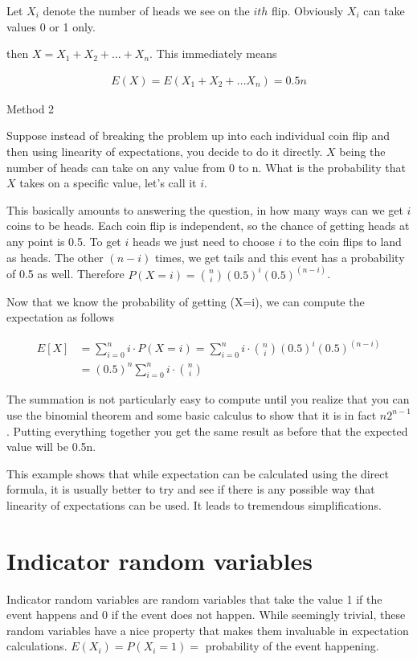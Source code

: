 \documentclass[12pt]{article}
\begin{document}
Let $X_i$ denote the number of heads we see on the $ith$ flip. Obviously $X_i$ can take values 0 or 1 only. 

then $X = X_1 + X_2 + \ldots + X_n$. This immediately means

\begin{align*}
E(X) = E(X_1 + X_2 + \ldots X_n) = 0.5n
\end{align*}

Method 2

Suppose instead of breaking the problem up into each individual coin flip and then using linearity of expectations, you decide to do it directly. $X$ being the number of heads can take on any value from 0 to n. What is the probability that $X$ takes on a specific value, let's call it $i$. 

This basically amounts to answering the question, in how many ways can we get $i$ coins to be heads. Each coin flip is independent, so the chance of getting heads at any point is 0.5. To get $i$ heads we just need to choose $i$ to the coin flips to land as heads. The other $(n-i)$ times, we get tails and this event has a probability of 0.5 as well. Therefore $P(X=i) = \binom{n}{i}(0.5)^i(0.5)^{(n-i)}$.

Now that we know the probability of getting (X=i), we can compute the expectation as follows

\begin{align*}
E[X] &= \sum_{i=0}^n i \cdot P(X=i) = \sum_{i=0}^n i \cdot \binom{n}{i}(0.5)^i(0.5)^{(n-i)} \\
&=(0.5)^n \sum_{i=0}^n i \cdot \binom{n}{i}
\end{align*}

The summation is not particularly easy to compute until you realize that you can use the binomial theorem and some basic calculus to show that it is in fact $n2^{n-1}$. Putting everything together you get the same result as before that the expected value will be 0.5n.

This example shows that while expectation can be calculated using the direct formula, it is usually better to try and see if there is any possible way that linearity of expectations can be used. It leads to tremendous simplifications.

\section*{Indicator random variables}

Indicator random variables are random variables that take the value 1 if the event happens and 0 if the event does not happen. While seemingly trivial, these random variables have a nice property that makes them invaluable in expectation calculations. $E(X_i) = P(X_i=1) = $ probability of the event happening. 
\end{document}
